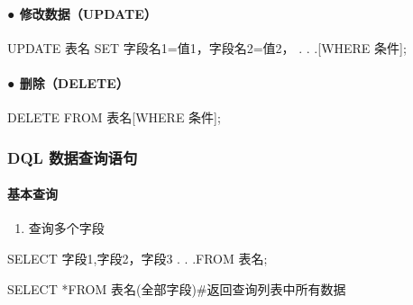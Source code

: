 \documentclass[
  letterpaper,
  DIV=11,
  numbers=noendperiod]{scrreprt}
\let\oldparagraph\paragraph
\renewcommand{\paragraph}[1]{\oldparagraph{#1}\mbox{}}
\newenvironment{Shaded}{\begin{snugshade}}{\end{snugshade}}
\newcommand{\KeywordTok}[1]{\textcolor[rgb]{0.00,0.23,0.31}{#1}}
\newcommand{\NormalTok}[1]{\textcolor[rgb]{0.00,0.23,0.31}{#1}}
\newcommand{\OperatorTok}[1]{\textcolor[rgb]{0.37,0.37,0.37}{#1}}
\providecommand{\tightlist}{%
  \setlength{\itemsep}{0pt}\setlength{\parskip}{0pt}}\usepackage{longtable,booktabs,array}
\begin{document}
\hypertarget{ux4feeux6539ux6570ux636eupdate}{%
\paragraph{● 修改数据（UPDATE）}\label{ux4feeux6539ux6570ux636eupdate}}

\begin{Shaded}
\begin{Highlighting}[]
\KeywordTok{UPDATE}\NormalTok{ 表名 }\KeywordTok{SET}\NormalTok{ 字段名1}\OperatorTok{=}\NormalTok{值1，字段名2}\OperatorTok{=}\NormalTok{值2， . . .[}\KeywordTok{WHERE}\NormalTok{ 条件];}
\end{Highlighting}
\end{Shaded}

\hypertarget{ux5220ux9664delete}{%
\paragraph{● 删除（DELETE）}\label{ux5220ux9664delete}}

\begin{Shaded}
\begin{Highlighting}[]
\KeywordTok{DELETE} \KeywordTok{FROM}\NormalTok{ 表名[}\KeywordTok{WHERE}\NormalTok{ 条件];}
\end{Highlighting}
\end{Shaded}

\hypertarget{dql-ux6570ux636eux67e5ux8be2ux8bedux53e5}{%
\subsubsection{DQL
数据查询语句}\label{dql-ux6570ux636eux67e5ux8be2ux8bedux53e5}}

\hypertarget{ux57faux672cux67e5ux8be2}{%
\paragraph{基本查询}\label{ux57faux672cux67e5ux8be2}}

\begin{enumerate}
\def\labelenumi{\arabic{enumi}.}
\tightlist
\item
  查询多个字段
\end{enumerate}

\begin{Shaded}
\begin{Highlighting}[]
\KeywordTok{SELECT}\NormalTok{ 字段1,字段2，字段3 . . .}\KeywordTok{FROM}\NormalTok{ 表名;}

\KeywordTok{SELECT} \OperatorTok{*}\KeywordTok{FROM}\NormalTok{ 表名(全部字段)\#返回查询列表中所有数据}
\end{Highlighting}
\end{Shaded}
\end{document}
